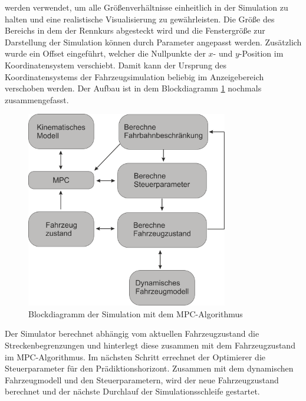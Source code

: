 \documentclass{like}
\begin{document}
werden verwendet, um alle Größenverhältnisse einheitlich in der Simulation zu halten und eine realistische Visualisierung zu gewährleisten. 
Die Größe des Bereichs in dem der Rennkurs abgesteckt wird und die Fenstergröße zur Darstellung der Simulation können durch Parameter angepasst werden. Zusätzlich wurde ein Offset eingeführt, welcher die Nullpunkte der \(x\)- und \(y\)-Position im Koordinatensystem verschiebt. Damit kann der Ursprung des Koordinatensystems der Fahrzeugsimulation beliebig im Anzeigebereich verschoben werden. 
Der Aufbau ist in dem Blockdiagramm \ref{fig:block_diagram_sim} nochmals zusammengefasst. 
\begin{figure}[ht!]
	\centering
	\includegraphics[width=250pt]{Abbildungen/MPCSimulation.png}
	\caption{Blockdiagramm der Simulation mit dem \ac{MPC}-Algorithmus}
	\label{fig:block_diagram_sim}
\end{figure}
Der Simulator berechnet abhängig vom aktuellen Fahrzeugzustand die Streckenbegrenzungen und hinterlegt diese zusammen mit dem Fahrzeugzustand im \ac{MPC}-Algorithmus. Im nächsten Schritt errechnet der Optimierer die Steuerparameter für den Prädiktionshorizont. Zusammen mit dem dynamischen Fahrzeugmodell und den Steuerparametern, wird der neue Fahrzeugzustand berechnet und der nächste Durchlauf der Simulationsschleife gestartet.
\end{document}
